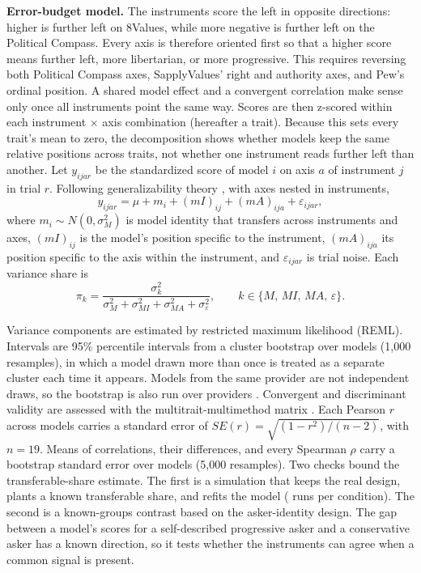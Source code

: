 \documentclass[12pt]{article}
\begin{document}
\textbf{Error-budget model.} The instruments score the left in opposite directions: higher is further left on 8Values,
while more negative is further left on the Political Compass. Every axis is therefore oriented first so that a higher
score means further left, more libertarian, or more progressive. This requires reversing both
Political Compass axes, SapplyValues' right and authority axes, and Pew's ordinal position. A shared model effect and a
convergent correlation make sense only once all instruments point the same way. Scores are then z-scored within each
instrument $\times$ axis combination (hereafter a trait). Because this sets every trait's mean to zero, the
decomposition shows whether models keep the same relative positions across traits, not whether one instrument reads
further left than another. Let $y_{ijar}$ be the standardized score of model $i$ on axis $a$ of instrument $j$ in trial
$r$. Following generalizability theory \citep{cronbach1972, brennan2001}, with axes nested in instruments,
\begin{equation}
y_{ijar} = \mu + m_i + (mI)_{ij} + (mA)_{ija} + \varepsilon_{ijar},
\label{eq:model}
\end{equation}
where $m_i\sim N(0,\sigma^2_{M})$ is model identity that transfers across instruments and axes, $(mI)_{ij}$ is the
model's position specific to the instrument, $(mA)_{ija}$ its position specific to the axis within the instrument, and
$\varepsilon_{ijar}$ is trial noise. Each variance share is
\begin{equation}
\pi_k = \frac{\sigma^2_k}{\sigma^2_{M}+\sigma^2_{MI}+\sigma^2_{MA}+\sigma^2_{\varepsilon}},\qquad
k\in\{M,\,MI,\,MA,\,\varepsilon\}.
\label{eq:share}
\end{equation}

Variance components are estimated by restricted maximum likelihood (REML). Intervals are 95\% percentile intervals from
a cluster bootstrap over models (1,000 resamples), in which a model drawn more than once is treated as a separate
cluster each time it appears. Models from the same provider are not independent draws, so the bootstrap is also run
over providers \citep{cameron2008}. Convergent and discriminant validity are assessed with the multitrait-multimethod
matrix \citep{campbell1959}. Each Pearson $r$ across models carries a standard error of
$SE(r)=\sqrt{(1-r^2)/(n-2)}$, with $n=19$. Means of correlations, their differences, and every Spearman $\rho$ carry a
bootstrap standard error over models (5,000 resamples). Two checks bound the transferable-share estimate. The first is
a simulation that keeps the real design, plants a known transferable share, and refits the model (\SimReps{} runs per
condition). The second is a known-groups contrast based on the asker-identity design. The gap between a model's scores
for a self-described progressive asker and a conservative asker has a known direction, so it tests
whether the instruments can agree when a common signal is present.
\end{document}
